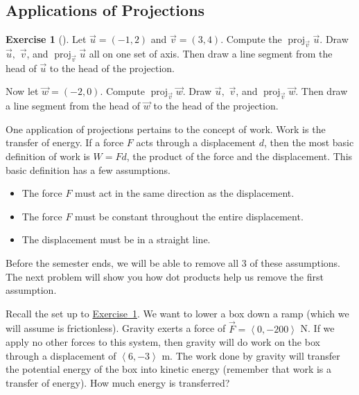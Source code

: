 \documentclass[10pt,]{book}
\theoremstyle{plain}
\theoremstyle{definition}
\theoremstyle{definition}
\theoremstyle{definition}
\theoremstyle{definition}
\newtheorem{exploration}[project]{Exercise}
\theoremstyle{definition}
\numberwithin{equation}{section}
\DeclareMathOperator{\proj}{proj}
\newcommand{\lt}{<}
\begin{document}
\subsection[{Applications of Projections}]{Applications of Projections}\label{subsection-14}
\begin{exploration}[]\label{exploration-51}
Let \(\vec u=(-1,2)\) and \(\vec v=(3,4)\). Compute the \(\proj_{\vec v}\vec u\). Draw \(\vec u,\) \(\vec v\), and \(\proj_{\vec v}\vec u\) all on one set of axis. Then draw a line segment from the head of \(\vec u\) to the head of the projection.%
\par
Now let \(\vec w=(-2,0)\). Compute \(\proj_{\vec v}\vec w\). Draw \(\vec u,\) \(\vec v\), and \(\proj_{\vec v}\vec w\). Then draw a line segment from the head of \(\vec w\) to the head of the projection.%
\end{exploration}
One application of projections pertains to the concept of work. Work is the transfer of energy. If a force \(F\) acts through a displacement \(d\), then the most basic definition of work is \(W=Fd\), the product of the force and the displacement. This basic definition has a few assumptions. \leavevmode%
\begin{itemize}[label=\textbullet]
\item{}The force \(F\) must act in the same direction as the displacement.%
\item{}The force \(F\) must be constant throughout the entire displacement.%
\item{}The displacement must be in a straight line.%
\end{itemize}
%
\par
Before the semester ends, we will be able to remove all 3 of these assumptions. The next problem will show you how dot products help us remove the first assumption.%
\par
Recall the set up to \hyperref[prob_force_intro]{Exercise~1}. We want to lower a box down a ramp (which we will assume is frictionless). Gravity exerts a force of \(\vec F=\left\lt 0,-200\right>\) N. If we apply no other forces to this system, then gravity will do work on the box through a displacement of \(\left\lt 6,-3\right>\) m. The work done by gravity will transfer the potential energy of the box into kinetic energy (remember that work is a transfer of energy). How much energy is transferred?%
\end{document}
